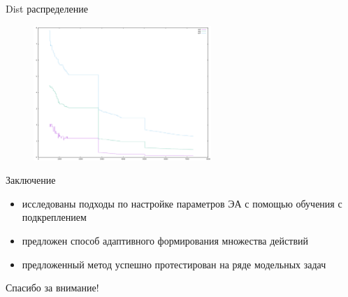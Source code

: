 \documentclass[hyperref=unicode,graphics=pdflatex,13pt]{beamer}
\begin{document}
\begin{frame}{Dist распределение}
    \begin{figure}
        \centering
        \includegraphics[width=0.6\textwidth]{parts_20.png}
    \end{figure}
\end{frame}

\begin{frame}{Заключение}
    \begin{itemize}
        \item исследованы подходы по настройке параметров ЭА с помощью обучения с подкреплением
        \item предложен способ адаптивного формирования множества действий
        \item предложенный метод успешно протестирован на ряде модельных задач
    \end{itemize}
\end{frame}

\begin{frame}
    \begin{center}
        Спасибо за внимание!
    \end{center}
\end{frame}
\end{document}
